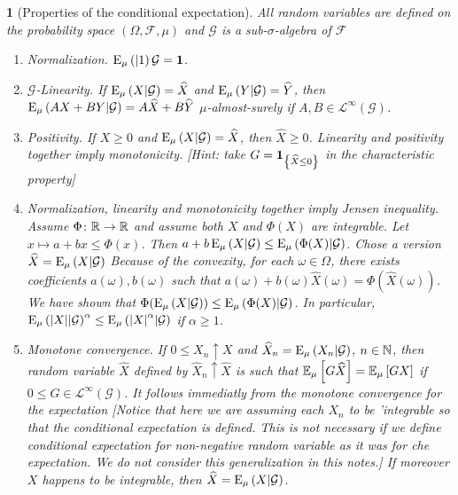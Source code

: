 \documentclass[12pt,a4paper]{amsart}
\newcommand{\one}{\bm 1}
\theoremstyle{plain}%
\newtheorem{npar}{}%
\theoremstyle{definition}
\theoremstyle{remark}
\begin{document}
\begin{npar}[Properties of the conditional expectation] \normalfont All random variables are defined on the probability space $(\Omega,\mathcal F,\mu)$ and $\mathcal G$ is a sub-$\sigma$-algebra of $\mathcal F$
\begin{enumerate}
\item \emph{Normalization}. $\condexpat \mu \one {\mathcal G} = \one$.
\item \emph{$\mathcal G$-Linearity}. If $\operatorname{E}_{\mu}\left(X \middle| \mathcal G\right) = \widehat X$ and $\operatorname{E}_{\mu}\left(Y \middle| \mathcal G\right) = \widehat Y$, then $\operatorname{E}_{\mu}\left(A X + B Y \middle| \mathcal G\right) = A \widehat X + B \widehat Y$ $\mu$-almost-surely if $A,B \in \mathcal L^{\infty}(\mathcal G)$.
\item \emph{Positivity}. If $X \ge 0$ and $\operatorname{E}_{\mu}\left(X \middle| \mathcal G\right) = \widehat X$, then $\widehat X \ge 0$. Linearity and positivity together imply monotonicity. [Hint: take $G = \one_{\set{\widehat X \le 0}}$ in the characteristic property]
\item Normalization, linearity and monotonicity together imply \emph{Jensen inequality}. Assume $\Phi \colon \mathbb{R} \to \mathbb{R}$ and assume both $X$ and $\Phi(X)$ are integrable. Let $x \mapsto a + bx \le \Phi(x)$. Then $a + b \operatorname{E}_{\mu}\left(X \middle| \mathcal G\right)\le \operatorname{E}_{\mu}\left(\Phi(X) \middle| \mathcal G\right)$. Chose a version $\widehat X = \operatorname{E}_{\mu}\left(X \middle| \mathcal G\right)$ Because of the convexity, for each $\omega \in \Omega$, there exists coefficients $a(\omega), b(\omega)$ such that $a(\omega) + b(\omega) \widehat X(\omega) = \Phi(\widehat X(\omega))$. We have shown that  $\Phi(\operatorname{E}_{\mu}\left(X \middle| \mathcal G\right)) \le \operatorname{E}_{\mu}\left(\Phi(X) \middle| \mathcal G\right)$. In particular, $\operatorname{E}_{\mu}\left(\left\vert X\right\vert \middle| \mathcal G\right)^\alpha \le \operatorname{E}_{\mu}\left({\left\vert X\right\vert}^\alpha \middle| \mathcal G\right)$ if $\alpha \ge 1$.
\item \emph{Monotone convergence}. If $0 \le X_n \uparrow X$ and $\widehat X_n = \operatorname{E}_{\mu}\left(X_n \middle| \mathcal G\right)$, $n \in \mathbb{N}$, then random variable $\widehat X$ defined by $\widehat X_n \uparrow \widehat X$ is such that $\operatorname{\mathbb E}_{\mu}\left[G\widehat X\right] = \operatorname{\mathbb E}_{\mu}\left[GX\right]$ if $0 \le G \in \mathcal L^{\infty}(\mathcal G)$. It follows immediatly from the monotone convergence for the expectation [Notice that here we are assuming each $X_n$ to be 'integrable so that the conditional expectation is defined. This is not necessary if we define conditional expectation for non-negative random variable as it was for che expectation. We do not consider this generalization in this notes.] If moreover $X$ happens to be integrable, then $\widehat X = \operatorname{E}_{\mu}\left(X \middle| \mathcal G\right)$.

\end{enumerate}
\end{npar}
\end{document}
